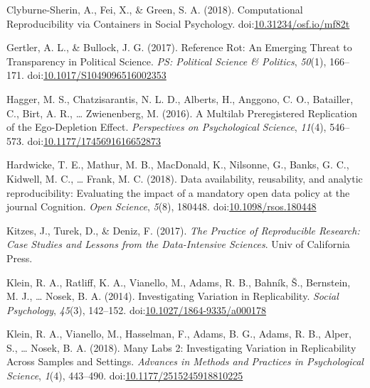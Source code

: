 \documentclass[,jou, a4paper,floatsintext]{apa6}
\begin{document}
\leavevmode\hypertarget{ref-clyburne-sherin_computational_2018}{}%
Clyburne-Sherin, A., Fei, X., \& Green, S. A. (2018). Computational Reproducibility via Containers in Social Psychology. doi:\href{https://doi.org/10.31234/osf.io/mf82t}{10.31234/osf.io/mf82t}

\leavevmode\hypertarget{ref-gertler_reference_2017}{}%
Gertler, A. L., \& Bullock, J. G. (2017). Reference Rot: An Emerging Threat to Transparency in Political Science. \emph{PS: Political Science \& Politics}, \emph{50}(1), 166--171. doi:\href{https://doi.org/10.1017/S1049096516002353}{10.1017/S1049096516002353}

\leavevmode\hypertarget{ref-hagger_multilab_2016}{}%
Hagger, M. S., Chatzisarantis, N. L. D., Alberts, H., Anggono, C. O., Batailler, C., Birt, A. R., \ldots{} Zwienenberg, M. (2016). A Multilab Preregistered Replication of the Ego-Depletion Effect. \emph{Perspectives on Psychological Science}, \emph{11}(4), 546--573. doi:\href{https://doi.org/10.1177/1745691616652873}{10.1177/1745691616652873}

\leavevmode\hypertarget{ref-hardwicke_data_2018}{}%
Hardwicke, T. E., Mathur, M. B., MacDonald, K., Nilsonne, G., Banks, G. C., Kidwell, M. C., \ldots{} Frank, M. C. (2018). Data availability, reusability, and analytic reproducibility: Evaluating the impact of a mandatory open data policy at the journal Cognition. \emph{Open Science}, \emph{5}(8), 180448. doi:\href{https://doi.org/10.1098/rsos.180448}{10.1098/rsos.180448}

\leavevmode\hypertarget{ref-kitzes_practice_2017}{}%
Kitzes, J., Turek, D., \& Deniz, F. (2017). \emph{The Practice of Reproducible Research: Case Studies and Lessons from the Data-Intensive Sciences}. Univ of California Press.

\leavevmode\hypertarget{ref-klein_investigating_2014}{}%
Klein, R. A., Ratliff, K. A., Vianello, M., Adams, R. B., Bahník, Š., Bernstein, M. J., \ldots{} Nosek, B. A. (2014). Investigating Variation in Replicability. \emph{Social Psychology}, \emph{45}(3), 142--152. doi:\href{https://doi.org/10.1027/1864-9335/a000178}{10.1027/1864-9335/a000178}

\leavevmode\hypertarget{ref-klein_many_2018}{}%
Klein, R. A., Vianello, M., Hasselman, F., Adams, B. G., Adams, R. B., Alper, S., \ldots{} Nosek, B. A. (2018). Many Labs 2: Investigating Variation in Replicability Across Samples and Settings. \emph{Advances in Methods and Practices in Psychological Science}, \emph{1}(4), 443--490. doi:\href{https://doi.org/10.1177/2515245918810225}{10.1177/2515245918810225}
\end{document}
